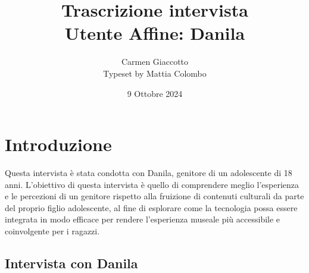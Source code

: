\documentclass{article}
\title{\textbf{Trascrizione intervista}\\ Utente Affine: Danila}
\author{Carmen Giaccotto \\ Typeset by Mattia Colombo}
\date{9 Ottobre 2024}
\begin{document}
\maketitle

\section{Introduzione}
Questa intervista è stata condotta con Danila, genitore di un adolescente di 18 anni.
L'obiettivo di questa intervista è quello di comprendere meglio l'esperienza e le percezioni di un genitore rispetto alla fruizione di contenuti culturali da parte del proprio figlio adolescente, al fine di esplorare come la tecnologia possa essere integrata in modo efficace per rendere l’esperienza museale più accessibile e coinvolgente per i ragazzi.

\subsection{\textcolor{subsectioncolor}{Intervista con Danila}}
\end{document}
